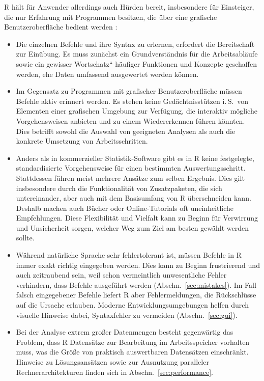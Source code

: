 R hält für Anwender allerdings auch Hürden bereit, insbesondere für Einsteiger, die nur Erfahrung mit Programmen besitzen, die über eine grafische Benutzeroberfläche bedient werden \cite{Muenchen2018}:
\begin{itemize}
\item Die einzelnen Befehle und ihre Syntax zu erlernen, erfordert die Bereitschaft zur Einübung. Es muss zunächst ein Grundverständnis für die Arbeitsabläufe sowie ein gewisser {\quotedblbase}Wortschatz{\textquotedblleft} häufiger Funktionen und Konzepte geschaffen werden, ehe Daten umfassend ausgewertet werden können.
\item Im Gegensatz zu Programmen mit grafischer Benutzeroberfläche müssen Befehle aktiv erinnert werden. Es stehen keine Gedächtnisstützen i.\,S.\ von Elementen einer grafischen Umgebung zur Verfügung, die interaktiv mögliche Vorgehensweisen anbieten und zu einem Wiedererkennen führen könnten. Dies betrifft sowohl die Auswahl von geeigneten Analysen als auch die konkrete Umsetzung von Arbeitsschritten.
\item Anders als in kommerzieller Statistik-Software gibt es in R keine festgelegte, standardisierte Vorgehensweise für einen bestimmten Auswertungsschritt. Stattdessen führen meist mehrere Ansätze zum selben Ergebnis. Dies gilt insbesondere durch die Funktionalität von Zusatzpaketen, die sich untereinander, aber auch mit dem Basisumfang von R überschneiden kann. Deshalb machen auch Bücher oder Online-Tutorials oft uneinheitliche Empfehlungen. Diese Flexibilität und Vielfalt kann zu Beginn für Verwirrung und Unsicherheit sorgen, welcher Weg zum Ziel am besten gewählt werden sollte.
\item Während natürliche Sprache sehr fehlertolerant ist, müssen Befehle in R immer exakt richtig eingegeben werden. Dies kann zu Beginn frustrierend und auch zeitraubend sein, weil schon vermeintlich unwesentliche Fehler verhindern, dass Befehle ausgeführt werden (Abschn.\ \ref{sec:mistakes}). Im Fall falsch eingegebener Befehle liefert R aber Fehlermeldungen, die Rückschlüsse auf die Ursache erlauben. Moderne Entwicklungsumgebungen helfen durch visuelle Hinweise dabei, Syntaxfehler zu vermeiden (Abschn.\ \ref{sec:gui}).
\item Bei der Analyse extrem großer Datenmengen besteht gegenwärtig das Problem, dass R Datensätze zur Bearbeitung im Arbeitsspeicher vorhalten muss, was die Größe von praktisch auswertbaren Datensätzen einschränkt. Hinweise zu Lösungsansätzen sowie zur Ausnutzung paralleler Rechnerarchitekturen finden sich in Abschn.\ \ref{sec:performance}.
\end{itemize}

